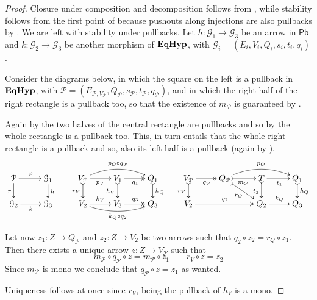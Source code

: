 \documentclass[a4paper,UKenglish,cleveref,pdftex,thm-restate,numberwithinsect]{lipics-v2021}
\newcommand{\pbc}{\mathsf{Pb}}
\newcommand{\catname}[1]{\textbf{\textup{#1}}}
\newcommand{\EqHyp}{\catname{EqHyp}} %
\begin{document}
\begin{proof}\label{proof:pbmono}
	Closure under composition and decomposition follows from , while stability follows from the first point of  because pushouts along injections are also pullbacks by . We are left with stability under pullbacks. 
	Let $h\colon \mathcal{G}_1\to \mathcal{G}_3$ be an arrow in $\pbc$ and $k\colon \mathcal{G}_2\to \mathcal{G}_3$ be another morphism of $\EqHyp$, with $\mathcal{G}_{i}=(E_i, V_i, Q_i, s_i, t_i, q_i)$.
	
	Consider the diagrams below, in which the square on the left is a pullback in $\EqHyp$, with $\mathcal{P}=(E_{\mathcal{P}, V_{\mathcal{P}}}, Q_{\mathcal{P}}, s_{\mathcal{P}}, t_{\mathcal{P}}, q_{\mathcal{P}})$, and in which the right half of the right rectangle is a pullback too, so that the existence of $m_\mathcal{P}$ is guaranteed by . 
	
	Again by  the two halves of the central rectangle are pullbacks and so by  the whole rectangle is a pullback too. This, in turn entails that the whole right rectangle is a pullback and so, also its left half is a pullback (again by ).
	\[
	\xymatrix@R=15pt{\mathcal{P} \ar[r]^{p} \ar[d]_{r}&  \mathcal{G}_1 \ar[d]^{h} &
		V_{\mathcal{P}} \ar@/^.4cm/[rr]^{p_Q\circ q_{\mathcal{P}}} \ar[r]_{p_V} \ar@{>->}[d]_{r_V}& V_1  \ar@{>>}[r]_{q_1} \ar@{>->}[d]_{h_V}& Q_1 \ar@{>->}[d]^{h_Q}& V_{\mathcal{P}} \ar@{>>}[r]_{q_{\mathcal{P}}} \ar@{>->}[d]_{r_V} & Q_{\mathcal{P}} \ar@{>->}[dr]_{r_Q} \ar@/^.4cm/[rr]^{p_Q} \ar@{>->}[r]_{m_{\mathcal{P}}}& T \ar[r]_{t_1} \ar@{>->}[d]_{t_2} & Q_1 \ar@{>->}[d]^{h_Q}\\
		\mathcal{G}_2 \ar[r]_{k} & \mathcal{G}_3 &   V_2  \ar@/_.3cm/[rr]_{k_Q\circ q_2}\ar[r]^{k_V}& V_3 \ar@{>>}[r]^{q_3} & Q_3 &V_2 \ar@{>>}[rr]^{q_2}&& Q_2 \ar[r]^{k_Q} & Q_3 }
	\]
	
	
	
	Let now $z_1\colon Z\to Q_{\mathcal{P}}$ and $z_2\colon Z\to V_2$ be two arrows such that $q_2\circ z_2=r_Q\circ z_1$. Then there exists a unique arrow $z\colon Z\to V_{\mathcal{P}}$ such that
	\[m_{\mathcal{P}}\circ q_{\mathcal{P}}\circ z= m_{\mathcal{P}}\circ z_1 \qquad r_V\circ z=z_2\]
	Since $m_\mathcal{P}$ is mono we conclude that $q_{\mathcal{P}}\circ z=z_1$ as wanted.
	
	Uniqueness follows at once since $r_V$, being the pullback of $h_V$ is a mono.
\end{proof}
\end{document}
